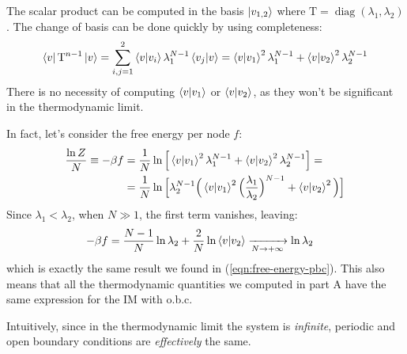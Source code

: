 \documentclass[12pt,a4paper]{report}
\begin{document}
The scalar product can be computed in the basis $\ket{v_{1,2}}$ where $\mathrm{T} = \operatorname{diag}(\lambda_1, \lambda_2)$. The change of basis can be done quickly by using completeness:
\begin{align*}
    \bra{v} \mathrm{T}^{n-1} \ket{v} = \sum_{i,j=1}^2 \braket{v}{v_i} \lambda_1^{N-1} \braket{v_j}{v} = \braket{v}{v_1}^2 \lambda_1^{N-1} + \braket{v}{v_2}^2 \lambda_2^{N-1}
\end{align*}
There is no necessity of computing $\braket{v}{v_1}$ or $\braket{v}{v_2}$, as they won't be significant in the thermodynamic limit.

\medskip

In fact, let's consider the free energy per node $f$:
\begin{align}\label{eqn:free-energy-limit}
    \frac{\ln Z}{N} \equiv -\beta f &= \frac{1}{N} \ln \Big[ \braket{v}{v_1}^2 \lambda_1^{N-1} + \braket{v}{v_2}^2 \lambda_2^{N-1}\Big] =\\ \nonumber
    &= \frac{1}{N} \ln \Big[ \lambda_2^{N-1}\Big( \braket{v}{v_1}^2 \Big(\frac{\lambda_1}{\lambda_2}\Big)^{N-1} + \braket{v}{v_2}^2 \Big) \Big] 
\end{align}
Since $\lambda_1 < \lambda_2$, when $N \gg 1$, the first term vanishes, leaving:
\begin{align*}
    -\beta f &= \frac{N-1}{N} \ln \lambda_2 + \frac{2}{N} \ln \braket{v}{v_2}  \xrightarrow[N \to +\infty]{} \ln \lambda_2
\end{align*}
which is exactly the same result we found in (\ref{eqn:free-energy-pbc}). This also means that all the thermodynamic quantities we computed in part A have the same expression for the IM with o.b.c.

\medskip

Intuitively, since in the thermodynamic limit the system is \textit{infinite}, periodic and open boundary conditions are \textit{effectively} the same.  
\end{document}
